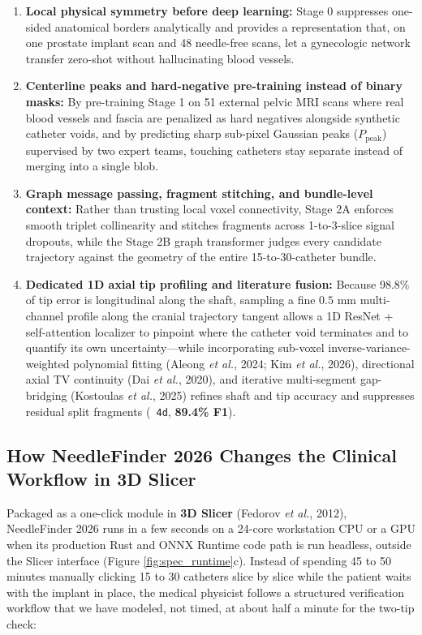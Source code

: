 \documentclass[
  11pt,
]{article}
\providecommand{\tightlist}{%
  \setlength{\itemsep}{0pt}\setlength{\parskip}{0pt}}
\let\nforigtexttt\texttt
\renewcommand{\texttt}[1]{\nforigtexttt{\XeTeXinterchartokenstate=1 #1}}
\begin{document}
\begin{enumerate}
\def\labelenumi{\arabic{enumi}.}
\tightlist
\item
  \textbf{Local physical symmetry before deep learning:} Stage 0
  suppresses one-sided anatomical borders analytically and provides a
  representation that, on one prostate implant scan and 48 needle-free
  scans, let a gynecologic network transfer zero-shot without
  hallucinating blood vessels.
\item
  \textbf{Centerline peaks and hard-negative pre-training instead of
  binary masks:} By pre-training Stage 1 on 51 external pelvic MRI scans
  where real blood vessels and fascia are penalized as hard negatives
  alongside synthetic catheter voids, and by predicting sharp sub-pixel
  Gaussian peaks (\(P_{\text{peak}}\)) supervised by two expert teams,
  touching catheters stay separate instead of merging into a single
  blob.
\item
  \textbf{Graph message passing, fragment stitching, and bundle-level
  context:} Rather than trusting local voxel connectivity, Stage 2A
  enforces smooth triplet collinearity and stitches fragments across
  1-to-3-slice signal dropouts, while the Stage 2B graph transformer
  judges every candidate trajectory against the geometry of the entire
  15-to-30-catheter bundle.
\item
  \textbf{Dedicated 1D axial tip profiling and literature fusion:}
  Because 98.8\% of tip error is longitudinal along the shaft, sampling
  a fine \(0.5\text{ mm}\) multi-channel profile along the cranial
  trajectory tangent allows a 1D ResNet + self-attention localizer to
  pinpoint where the catheter void terminates and to quantify its own
  uncertainty---while incorporating sub-voxel inverse-variance-weighted
  polynomial fitting (Aleong \emph{et al.}, 2024; Kim \emph{et al.},
  2026), directional axial TV continuity (Dai \emph{et al.}, 2020), and
  iterative multi-segment gap-bridging (Kostoulas \emph{et al.}, 2025)
  refines shaft and tip accuracy and suppresses residual split fragments
  (\texttt{4d}, \textbf{89.4\% F1}).
\end{enumerate}

\subsection{How NeedleFinder 2026 Changes the Clinical Workflow in 3D
Slicer}\label{how-needlefinder-2026-changes-the-clinical-workflow-in-3d-slicer}

Packaged as a one-click module in \textbf{3D Slicer} (Fedorov \emph{et
al.}, 2012), NeedleFinder 2026 runs in a few seconds on a 24-core
workstation CPU or a GPU when its production Rust and ONNX Runtime code
path is run headless, outside the Slicer interface (Figure
\ref{fig:spec_runtime}c). Instead of spending 45 to 50 minutes manually
clicking 15 to 30 catheters slice by slice while the patient waits with
the implant in place, the medical physicist follows a structured
verification workflow that we have modeled, not timed, at about half a
minute for the two-tip check:
\end{document}
